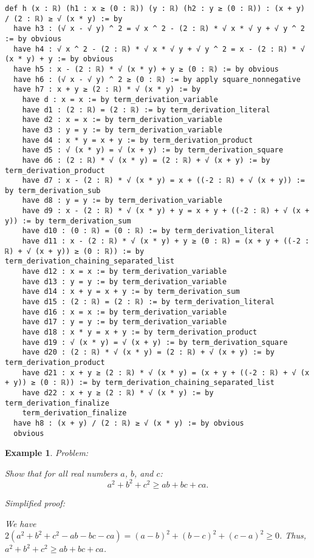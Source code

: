 \documentclass{article}
\newtheorem{example}{Example}
\begin{document}
\begin{tcolorbox}[colback=white!10, width=\linewidth]
\begin{lstlisting}[language=Lean4]
def h (x : ℝ) (h1 : x ≥ (0 : ℝ)) (y : ℝ) (h2 : y ≥ (0 : ℝ)) : (x + y) / (2 : ℝ) ≥ √ (x * y) := by
  have h3 : (√ x - √ y) ^ 2 = √ x ^ 2 - (2 : ℝ) * √ x * √ y + √ y ^ 2 := by obvious
  have h4 : √ x ^ 2 - (2 : ℝ) * √ x * √ y + √ y ^ 2 = x - (2 : ℝ) * √ (x * y) + y := by obvious
  have h5 : x - (2 : ℝ) * √ (x * y) + y ≥ (0 : ℝ) := by obvious
  have h6 : (√ x - √ y) ^ 2 ≥ (0 : ℝ) := by apply square_nonnegative
  have h7 : x + y ≥ (2 : ℝ) * √ (x * y) := by
    have d : x = x := by term_derivation_variable
    have d1 : (2 : ℝ) = (2 : ℝ) := by term_derivation_literal
    have d2 : x = x := by term_derivation_variable
    have d3 : y = y := by term_derivation_variable
    have d4 : x * y = x + y := by term_derivation_product
    have d5 : √ (x * y) = √ (x + y) := by term_derivation_square
    have d6 : (2 : ℝ) * √ (x * y) = (2 : ℝ) + √ (x + y) := by term_derivation_product
    have d7 : x - (2 : ℝ) * √ (x * y) = x + ((-2 : ℝ) + √ (x + y)) := by term_derivation_sub
    have d8 : y = y := by term_derivation_variable
    have d9 : x - (2 : ℝ) * √ (x * y) + y = x + y + ((-2 : ℝ) + √ (x + y)) := by term_derivation_sum
    have d10 : (0 : ℝ) = (0 : ℝ) := by term_derivation_literal
    have d11 : x - (2 : ℝ) * √ (x * y) + y ≥ (0 : ℝ) = (x + y + ((-2 : ℝ) + √ (x + y)) ≥ (0 : ℝ)) := by term_derivation_chaining_separated_list
    have d12 : x = x := by term_derivation_variable
    have d13 : y = y := by term_derivation_variable
    have d14 : x + y = x + y := by term_derivation_sum
    have d15 : (2 : ℝ) = (2 : ℝ) := by term_derivation_literal
    have d16 : x = x := by term_derivation_variable
    have d17 : y = y := by term_derivation_variable
    have d18 : x * y = x + y := by term_derivation_product
    have d19 : √ (x * y) = √ (x + y) := by term_derivation_square
    have d20 : (2 : ℝ) * √ (x * y) = (2 : ℝ) + √ (x + y) := by term_derivation_product
    have d21 : x + y ≥ (2 : ℝ) * √ (x * y) = (x + y + ((-2 : ℝ) + √ (x + y)) ≥ (0 : ℝ)) := by term_derivation_chaining_separated_list
    have d22 : x + y ≥ (2 : ℝ) * √ (x * y) := by term_derivation_finalize
    term_derivation_finalize
  have h8 : (x + y) / (2 : ℝ) ≥ √ (x * y) := by obvious
  obvious

\end{lstlisting}
\end{tcolorbox}


\begin{example}
Problem:
\begin{tcolorbox}[colback=yellow!10, width=\linewidth]
Show that for all real numbers $a$, $b$, and $c$:
    $$a^2 + b^2 + c^2 \geq ab + bc + ca.$$
\end{tcolorbox}

Simplified proof:
\begin{tcolorbox}[colback=blue!10, width=\linewidth]
We have $2(a^2 + b^2 + c^2 - ab - bc - ca) = (a-b)^2 + (b-c)^2 + (c-a)^2 \ge 0$. Thus, $a^2 + b^2 + c^2 \geq ab + bc + ca$.
\end{tcolorbox}
\end{example}
\end{document}
